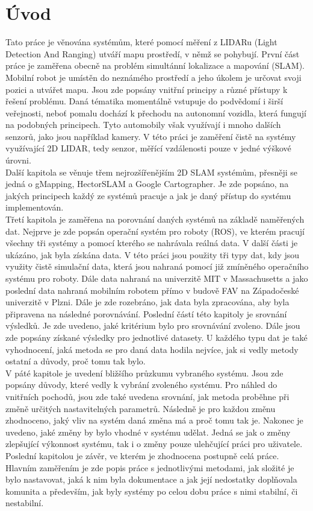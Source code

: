 \documentclass[12pt]{report}
\begin{document}
\chapter{Úvod}
Tato práce je věnována systémům, které pomocí měření z LIDARu (Light Detection And Ranging) utváří mapu prostředí, v němž se pohybují. První část práce je zaměřena obecně na problém simultánní lokalizace a mapování (SLAM). Mobilní robot je umístěn do neznámého prostředí a jeho úkolem je určovat svoji pozici a utvářet mapu. Jsou zde popsány vnitřní principy a různé přístupy k řešení problému. Daná tématika momentálně vstupuje do podvědomí i širší veřejnosti, neboť pomalu dochází k přechodu na autonomní vozidla, která fungují na podobných principech. Tyto automobily však využívají i mnoho dalších senzorů, jako jsou například kamery. V této práci je zaměření čistě na systémy využívající 2D LIDAR, tedy senzor, měřící vzdálenosti pouze v jedné výškové úrovni.\\
\indent Další kapitola se věnuje třem nejrozšířenějším 2D SLAM systémům, přesněji se jedná o gMapping, HectorSLAM a Google Cartographer. Je zde popsáno, na jakých principech každý ze systémů pracuje a jak je daný přístup do systému implementován. \\
\indent Třetí kapitola je zaměřena na porovnání daných systémů na základě naměřených dat. Nejprve je zde popsán operační systém pro roboty (ROS), ve kterém pracují všechny tři systémy a pomocí kterého se nahrávala reálná data. V další části je ukázáno, jak byla získána data. V této práci jsou použity tři typy dat, kdy jsou využity čistě simulační data, která jsou nahraná pomocí již zmíněného operačního systému pro roboty. Dále data nahraná na univerzitě MIT v Massachusetts a jako poslední data nahraná mobilním robotem přímo v budově FAV na Západočeské univerzitě v Plzni. Dále je zde rozebráno, jak data byla zpracována, aby byla připravena na následné porovnávání. Poslední částí této kapitoly je srovnání výsledků. Je zde uvedeno, jaké kritérium bylo pro srovnávání zvoleno. Dále jsou zde popsány získané výsledky pro jednotlivé datasety. U každého typu dat je také vyhodnocení, jaká metoda se pro daná data hodila nejvíce, jak si vedly metody ostatní a důvody, proč tomu tak bylo.\\
\indent V páté kapitole je uvedení bližšího průzkumu vybraného systému. Jsou zde popsány důvody, které vedly k vybrání zvoleného systému. Pro náhled do vnitřních pochodů, jsou zde také uvedena srovnání, jak metoda proběhne při změně určitých nastavitelných parametrů. Následně je pro každou změnu zhodnoceno, jaký vliv na systém daná změna má a proč tomu tak je. Nakonec je uvedeno, jaké změny by bylo vhodné v systému udělat. Jedná se jak o změny zlepšující výkonnost systému, tak i o změny pouze ulehčující práci pro uživatele.\\
\indent Poslední kapitolou je závěr, ve kterém je zhodnocena postupně celá práce. Hlavním zaměřením je zde popis práce s jednotlivými metodami, jak složité je bylo nastavovat, jaká k nim byla dokumentace a jak její nedostatky doplňovala komunita a především, jak byly systémy po celou dobu práce s nimi stabilní, či nestabilní.
\end{document}

